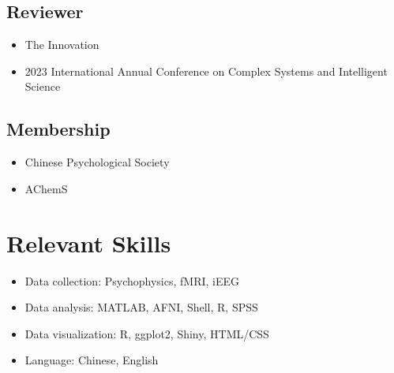 \documentclass[11pt,a4paper,]{awesome-cv}
\providecommand{\tightlist}{%
	\setlength{\itemsep}{0pt}\setlength{\parskip}{0pt}}
\begin{document}
\vspace{1.5mm}

\subsection{Reviewer}\label{reviewer}

\begin{itemize}
\tightlist
\item
  The Innovation
\item
  2023 International Annual Conference on Complex Systems and
  Intelligent Science
\end{itemize}

\subsection{Membership}\label{membership}

\begin{itemize}
\tightlist
\item
  Chinese Psychological Society
\item
  AChemS
\end{itemize}

\section{Relevant Skills}\label{relevant-skills}

\vspace{1.5mm}

\begin{itemize}
\tightlist
\item
  Data collection:\hspace{0.5em} Psychophysics,\hspace{0.3em}
  fMRI,\hspace{0.3em} iEEG
\item
  Data analysis:\hspace{0.5em} MATLAB,\hspace{0.3em} AFNI,\hspace{0.3em}
  Shell,\hspace{0.3em} R,\hspace{0.3em} SPSS
\item
  Data visualization:\hspace{0.5em} R,\hspace{0.3em}
  ggplot2,\hspace{0.3em} Shiny,\hspace{0.3em} HTML/CSS
\item
  Language:\hspace{0.5em} Chinese,\hspace{0.3em} English
\end{itemize}
\end{document}
